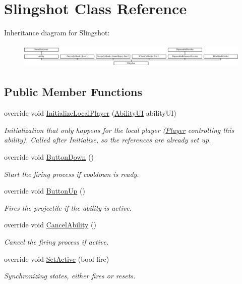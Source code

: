 \hypertarget{class_slingshot}{}\section{Slingshot Class Reference}
\label{class_slingshot}
Inheritance diagram for Slingshot\+:\begin{figure}[H]
\begin{center}
\leavevmode
\includegraphics[height=1.181435cm]{class_slingshot}
\end{center}
\end{figure}
\subsection*{Public Member Functions}
\begin{DoxyCompactItemize}
\item 
override void \hyperlink{class_slingshot_a449e53a29fab847e65cb55fc3ee4490e}{Initialize\+Local\+Player} (\hyperlink{class_ability_u_i}{Ability\+UI} ability\+UI)
\begin{DoxyCompactList}\small\item\em Initialization that only happens for the local player (\hyperlink{class_player}{Player} controlling this ability). Called after Initialize, so the references are already set up. \end{DoxyCompactList}\item 
override void \hyperlink{class_slingshot_a99edcb4d23f3b610620256ed5da498e5}{Button\+Down} ()
\begin{DoxyCompactList}\small\item\em Start the firing process if cooldown is ready. \end{DoxyCompactList}\item 
override void \hyperlink{class_slingshot_a6d052ffbe09939626984fb9af095be54}{Button\+Up} ()
\begin{DoxyCompactList}\small\item\em Fires the projectile if the ability is active. \end{DoxyCompactList}\item 
override void \hyperlink{class_slingshot_a53b90ca543630d2a799da52e0ba7684c}{Cancel\+Ability} ()
\begin{DoxyCompactList}\small\item\em Cancel the firing process if active. \end{DoxyCompactList}\item 
override void \hyperlink{class_slingshot_a98ea94317e1fe4e56cf8e08d5b892f30}{Set\+Active} (bool fire)
\begin{DoxyCompactList}\small\item\em Synchronizing states, either fires or resets. \end{DoxyCompactList}\end{DoxyCompactItemize}
